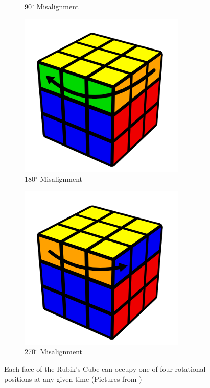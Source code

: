 \begin{figure}[h]
\begin{subfigure}{0.25\textwidth}
        \caption{90$^\circ$ Misalignment}
        \label{fig:rotation-misaligned-90}
    \end{subfigure}%
    \begin{subfigure}{0.25\textwidth}
        \centering
        \includegraphics[width=.90\linewidth]{Figures/4 Protocol Design/Specification/180_misaligned.png}
        \caption{180$^\circ$ Misalignment}
        \label{fig:rotation-misaligned-180}
    \end{subfigure}%
    \begin{subfigure}{0.25\textwidth}
        \centering
        \includegraphics[width=.90\linewidth]{Figures/4 Protocol Design/Specification/270_misaligned.png}
        \caption{270$^\circ$ Misalignment}
        \label{fig:rotation-misaligned-270}
    \end{subfigure}%
    \caption{Each face of the Rubik's Cube can occupy one of four rotational positions at any given time (Pictures from \cite{rubiks-turns-images})}
    \label{fig:rotation-alignment}
\end{figure}

